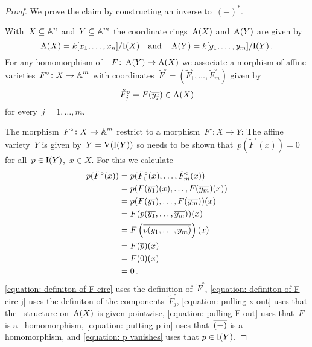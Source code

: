 \begin{proof}
  We prove the claim by constructing an inverse to~$(-)^*$.
  
  With~$X \subseteq \operatorname{\mathbb{A}}^n$ and~$Y \subseteq \operatorname{\mathbb{A}}^m$ the coordinate rings~$\operatorname{A}(X)$ and~$\operatorname{A}(Y)$ are given by
  \[
      \operatorname{A}(X)
    = k[x_1, \dotsc, x_n]/{\operatorname{I}(X)}
    \quad\text{and}\quad
      \operatorname{A}(Y)
    = k[y_1, \dotsc, y_m]/{\operatorname{I}(Y)} \,.
  \]
  For any homomorphism of~~$F \colon \operatorname{A}(Y) \to \operatorname{A}(X)$ we associate a morphism of affine varieties~$\tilde{F}^\circ \colon X \to \operatorname{\mathbb{A}}^m$ with coordinates~$\tilde{F}^\circ = (\tilde{F}^\circ_1, \dotsc, \tilde{F}^\circ_m)$ given by
  \[
        \tilde{F}^\circ_j
    =   F(\overline{y_j})
    \in \operatorname{A}(X)
  \]
  for every~$j = 1, \dotsc, m$.
  
  The morphism~$\tilde{F}^\circ \colon X \to \operatorname{\mathbb{A}}^m$ restrict to a morphism~$F^\circ \colon X \to Y$:
  The affine variety~$Y$ is given by~$Y = \operatorname{V}(\operatorname{I}(Y))$ so needs to be shown that~$p( \tilde{F}^\circ(x) ) = 0$ for all~$p \in \operatorname{I}(Y)$,~$x \in X$.
  For this we calculate
  \begin{align}
        p(\tilde{F}^\circ(x))
    &=  p( \tilde{F}^\circ_1(x), \dotsc, \tilde{F}^\circ_m(x) )
        \label{equation: definiton of F circ} \\
    &=  p( F(\overline{y_1})(x), \dotsc, F(\overline{y_m})(x) )
        \label{equation: definiton of F circ j} \\
    &=  p( F(\overline{y_1}), \dotsc, F(\overline{y_m}) )(x)
        \label{equation: pulling x out} \\
    &=  F( p(\overline{y_1}, \dotsc, \overline{y_m}) )(x)
        \label{equation: pulling F out} \\
    &=  F\left( \overline{p(y_1, \dotsc, y_m)} \right)(x)
        \label{equation: putting p in}\\
    &=  F(\overline{p})(x)
        \nonumber \\
    &=  F(0)(x)
        \label{equation: p vanishes}  \\
    &=  0
        \nonumber \,.
  \end{align}
  \cref{equation: definiton of F circ} uses the definition of~$\tilde{F}^\circ$, \cref{equation: definiton of F circ j} uses the definiton of the components~$\tilde{F}^\circ_j$, \cref{equation: pulling x out} uses that the~ structure on~$\operatorname{A}(X)$ is given pointwise, \cref{equation: pulling F out} uses that~$F$ is a~ homomorphism, \cref{equation: putting p in} uses that~$\overline{(-)}$ is a~ homomorphism, and \cref{equation: p vanishes} uses that $p \in \operatorname{I}(Y)$.
  

\end{proof}
